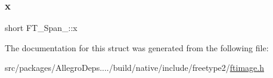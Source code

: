 \subsubsection{\texorpdfstring{x}{x}}
{\footnotesize\ttfamily short F\+T\+\_\+\+Span\+\_\+\+::x}



The documentation for this struct was generated from the following file\+:\begin{DoxyCompactItemize}
\item 
src/packages/\+Allegro\+Deps..../build/native/include/freetype2/\hyperlink{ftimage_8h}{ftimage.\+h}\end{DoxyCompactItemize}
